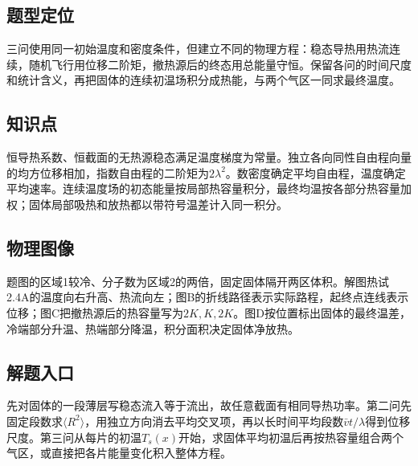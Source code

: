 \documentclass[UTF8,fontset=fandol,a4paper,11pt]{ctexart}
\begin{document}


\subsection*{题型定位}

三问使用同一初始温度和密度条件，但建立不同的物理方程：稳态导热用热流连续，随机飞行用位移二阶矩，撤热源后的终态用总能量守恒。保留各问的时间尺度和统计含义，再把固体的连续初温场积分成热能，与两个气区一同求最终温度。



\subsection*{知识点}

恒导热系数、恒截面的无热源稳态满足温度梯度为常量。独立各向同性自由程向量的均方位移相加，指数自由程的二阶矩为$2\lambda^2$。数密度确定平均自由程，温度确定平均速率。连续温度场的初态能量按局部热容量积分，最终均温按各部分热容量加权；固体局部吸热和放热都以带符号温差计入同一积分。



\subsection*{物理图像}

题图的区域1较冷、分子数为区域2的两倍，固定固体隔开两区体积。解图热试2.4A的温度向右升高、热流向左；图B的折线路径表示实际路程，起终点连线表示位移；图C把撤热源后的热容量写为$2K,K,2K$。图D按位置标出固体的最终温差，冷端部分升温、热端部分降温，积分面积决定固体净放热。



\subsection*{解题入口}

先对固体的一段薄层写稳态流入等于流出，故任意截面有相同导热功率。第二问先固定段数求$\langle R^2\rangle$，用独立方向消去平均交叉项，再以长时间平均段数$\bar vt/\lambda$得到位移尺度。第三问从每片的初温$T_s(x)$开始，求固体平均初温后再按热容量组合两个气区，或直接把各片能量变化积入整体方程。
\end{document}
